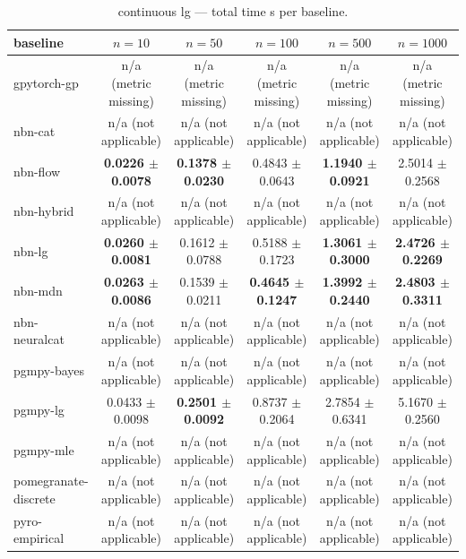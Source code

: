 
\begin{table}[h]
\centering
\caption{continuous lg — total time s per baseline.}
\label{tab:continuous_lg_total_time_s}
\begin{tabular}{lccccc}
\toprule
baseline & $n=10$ & $n=50$ & $n=100$ & $n=500$ & $n=1000$ \\
\midrule
gpytorch-gp & n/a (metric missing) & n/a (metric missing) & n/a (metric missing) & n/a (metric missing) & n/a (metric missing) \\
nbn-cat & n/a (not applicable) & n/a (not applicable) & n/a (not applicable) & n/a (not applicable) & n/a (not applicable) \\
nbn-flow & \textbf{0.0226 $\pm$ 0.0078} & \textbf{0.1378 $\pm$ 0.0230} & 0.4843 $\pm$ 0.0643 & \textbf{1.1940 $\pm$ 0.0921} & 2.5014 $\pm$ 0.2568 \\
nbn-hybrid & n/a (not applicable) & n/a (not applicable) & n/a (not applicable) & n/a (not applicable) & n/a (not applicable) \\
nbn-lg & \textbf{0.0260 $\pm$ 0.0081} & 0.1612 $\pm$ 0.0788 & 0.5188 $\pm$ 0.1723 & \textbf{1.3061 $\pm$ 0.3000} & \textbf{2.4726 $\pm$ 0.2269} \\
nbn-mdn & \textbf{0.0263 $\pm$ 0.0086} & 0.1539 $\pm$ 0.0211 & \textbf{0.4645 $\pm$ 0.1247} & \textbf{1.3992 $\pm$ 0.2440} & \textbf{2.4803 $\pm$ 0.3311} \\
nbn-neuralcat & n/a (not applicable) & n/a (not applicable) & n/a (not applicable) & n/a (not applicable) & n/a (not applicable) \\
pgmpy-bayes & n/a (not applicable) & n/a (not applicable) & n/a (not applicable) & n/a (not applicable) & n/a (not applicable) \\
pgmpy-lg & 0.0433 $\pm$ 0.0098 & \textbf{0.2501 $\pm$ 0.0092} & 0.8737 $\pm$ 0.2064 & 2.7854 $\pm$ 0.6341 & 5.1670 $\pm$ 0.2560 \\
pgmpy-mle & n/a (not applicable) & n/a (not applicable) & n/a (not applicable) & n/a (not applicable) & n/a (not applicable) \\
pomegranate-discrete & n/a (not applicable) & n/a (not applicable) & n/a (not applicable) & n/a (not applicable) & n/a (not applicable) \\
pyro-empirical & n/a (not applicable) & n/a (not applicable) & n/a (not applicable) & n/a (not applicable) & n/a (not applicable) \\
\bottomrule
\end{tabular}
\end{table}

